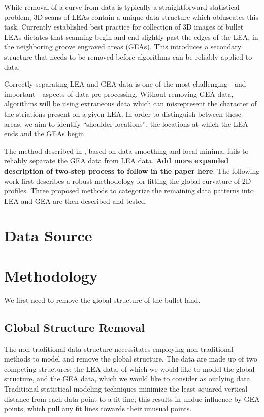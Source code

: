 \documentclass[12pt]{article}
\begin{document}
While removal of a curve from data is typically a straightforward
statistical problem, 3D scans of LEAs contain a unique data structure
which obfuscates this task. Currently established best practice for
collection of 3D images of bullet LEAs dictates that scanning begin and
end slightly past the edges of the LEA, in the neighboring groove
engraved areas (GEAs). This introduces a secondary structure that needs
to be removed before algorithms can be reliably applied to data.

Correctly separating LEA and GEA data is one of the most challenging -
and important - aspects of data pre-processing. Without removing GEA
data, algorithms will be using extraneous data which can misrepresent
the character of the striations present on a given LEA. In order to
distinguish between these areas, we aim to identify ``shoulder
locations'', the locations at which the LEA ends and the GEAs begin.

The method described in \citet{Hare1}, based on data smoothing and local
minima, fails to reliably separate the GEA data from LEA data.
\textbf{Add more expanded description of two-step process to follow in
the paper here}. The following work first describes a robust methodology
for fitting the global curvature of 2D profiles. Three proposed methods
to categorize the remaining data patterns into LEA and GEA are then
described and tested.

\section{Data Source}

\section{Methodology}

We first need to remove the global structure of the bullet land.

\subsection{Global Structure Removal}

The non-traditional data structure necessitates employing
non-traditional methods to model and remove the global structure. The
data are made up of two competing structures: the LEA data, of which we
would like to model the global structure, and the GEA data, which we
would like to consider as outlying data. Traditional statistical
modeling techniques minimize the least squared vertical distance from
each data point to a fit line; this results in undue influence by GEA
points, which pull any fit lines towards their unusual points.
\end{document}
